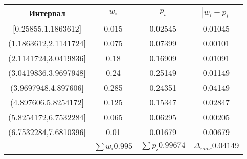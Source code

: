 %
\normalsize%
\begin{longtabu}spread 0pt{|c|c|c|c|}%
\hline%
Интервал&$w_i$&$p_i$&$|w_i-p_i|$\\%
\hline%
{[}0.25855,1.1863612{]}&0.015&0.02545&0.01045\\%
\hline%
(1.1863612,2.1141724{]}&0.075&0.07399&0.00101\\%
\hline%
(2.1141724,3.0419836{]}&0.18&0.16909&0.01091\\%
\hline%
(3.0419836,3.9697948{]}&0.24&0.25149&0.01149\\%
\hline%
(3.9697948,4.897606{]}&0.285&0.24351&0.04149\\%
\hline%
(4.897606,5.8254172{]}&0.125&0.15347&0.02847\\%
\hline%
(5.8254172,6.7532284{]}&0.065&0.06295&0.00205\\%
\hline%
(6.7532284,7.6810396{]}&0.01&0.01679&0.00679\\%
\hline%
{-}&$\sum w_i 0.995$&$\sum p_i 0.99674$&$\Delta_{max}0.04149$\\%
\hline%
\end{longtabu}%
%